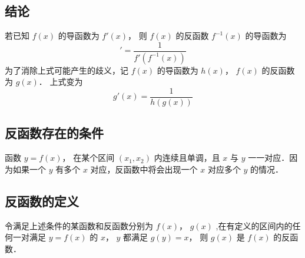 

\subsection{结论}
若已知 $f\left( x \right)$ 的导函数为 $f'\left( x \right)$， 则 $f\left( x \right)$ 的反函数 ${f^{ - 1}}\left( x \right)$ 的导函数为
\begin{equation}
[{f^{ - 1}}\left( x \right)]' = \frac{1}{{f'\left( {{f^{ - 1}}\left( x \right)} \right)}} 
\end{equation} 
为了消除上式可能产生的歧义，记 $f\left( x \right)$ 的导函数为 $h\left( x \right)$，  $f\left( x \right)$ 的反函数为 $g\left( x \right)$． 上式变为
 \begin{equation}
g'\left( x \right) = \frac{1}{{h\left( {g\left( x \right)} \right)}} 
\end{equation}
\subsection{反函数存在的条件}
函数 $y = f\left( x \right)$， 在某个区间 $\left( {{x_1},{x_2}} \right)$ 内连续且单调，且 $x$ 与 $y$ 一一对应．因为如果一个 $y$ 有多个 $x$ 对应，反函数中将会出现一个 $x$ 对应多个 $y$ 的情况．
\subsection{反函数的定义}
令满足上述条件的某函数和反函数分别为 $f\left( x \right)$，  $g\left( x \right)$ ,在有定义的区间内的任何一对满足 $y = f\left( x \right)$ 的 $x$，  $y$ 都满足 $g\left( y \right) = x$， 则 $g\left( x \right)$ 是 $f\left( x \right)$ 的反函数．

